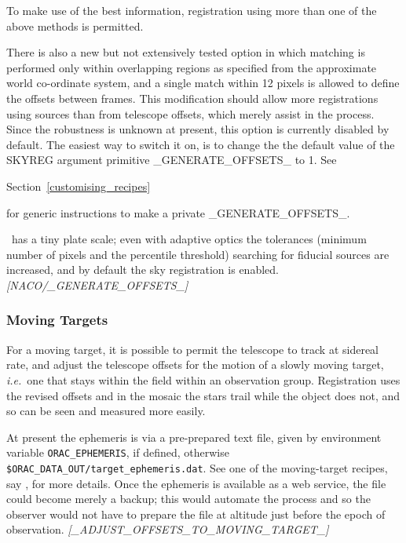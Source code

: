 \documentclass[twoside,11pt,nolof]{starlink}
\providecommand{\NACO}{\htmladdnormallink{NACO}{http://www.eso.org/instruments/naco/}}
\begin{document}
To make use of the best information, registration using more than one
of the above methods is permitted.

There is also a new but not extensively tested option in which
matching is performed only within overlapping regions as specified
from the approximate world co-ordinate system, and a single match
within 12 pixels is allowed to define the offsets between frames. This
modification should allow more registrations using sources than from
telescope offsets, which merely assist in the process.  Since the
robustness is unknown at present, this option is currently disabled by
default.  The easiest way to switch it on, is to change the
the default value of the SKYREG argument primitive \_GENERATE\_OFFSETS\_
to 1.  See
\begin{latexonly}
Section~\ref{customising_recipes}
\end{latexonly}


for generic instructions to make a private \_GENERATE\_OFFSETS\_.

\NACO\ has a tiny plate scale; even with adaptive optics the tolerances
(minimum number of pixels and the percentile threshold) searching for
fiducial sources are increased, and by default the sky registration is
enabled.
\newline \emph{[NACO/\_GENERATE\_OFFSETS\_]}

\subsubsection{Moving Targets\label{moving_targets}}

For a moving target, it is possible to permit the telescope to track
at sidereal rate, and adjust the telescope offsets for the motion of a
slowly moving target, \emph{i.e.}\ one that stays within the field
within an observation group.  Registration uses the revised
offsets and in the mosaic the stars trail while the object does not,
and so can be seen and measured more easily.

At present the ephemeris is via a pre-prepared text file, given by
environment variable \goodbreak \texttt{ORAC\_EPHEMERIS}, if defined, otherwise
{\tt\$ORAC\_DATA\_OUT/target\_ephemeris.dat}.  See one of the
moving-target recipes, say
, for
more details.  Once the ephemeris is available as a web service, the
file could become merely a backup; this would automate the process and
so the observer would not have to prepare the file at altitude just
before the epoch of observation.
\newline \emph{[\_ADJUST\_OFFSETS\_TO\_MOVING\_TARGET\_]}
\end{document}
